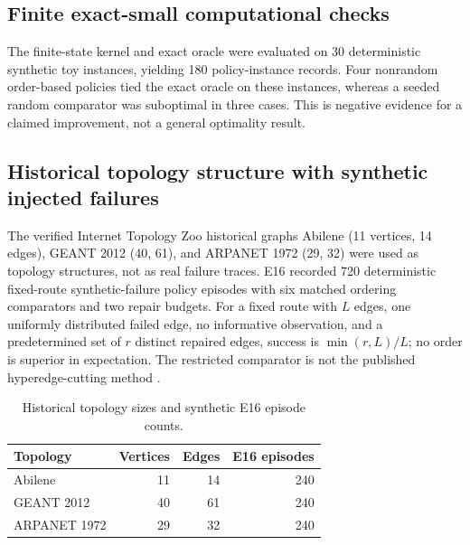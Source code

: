 \subsection{Finite exact-small computational checks}
The finite-state kernel and exact oracle were evaluated on 30 deterministic synthetic toy instances, yielding 180 policy-instance records. Four nonrandom order-based policies tied the exact oracle on these instances, whereas a seeded random comparator was suboptimal in three cases. This is negative evidence for a claimed improvement, not a general optimality result.

\subsection{Historical topology structure with synthetic injected failures}
The verified Internet Topology Zoo historical graphs Abilene (11 vertices, 14 edges), GEANT 2012 (40, 61), and ARPANET 1972 (29, 32) were used as topology structures, not as real failure traces. E16 recorded 720 deterministic fixed-route synthetic-failure policy episodes with six matched ordering comparators and two repair budgets. For a fixed route with $L$ edges, one uniformly distributed failed edge, no informative observation, and a predetermined set of $r$ distinct repaired edges, success is $\min(r,L)/L$; no order is superior in expectation. The restricted comparator is not the published hyperedge-cutting method \citep{Javdani2014}.

\begin{table}[H]\centering\small
\caption{Historical topology sizes and synthetic E16 episode counts.}\label{tab:e21-topologies}
\begin{tabular}{lrrr}\toprule
Topology & Vertices & Edges & E16 episodes\\\midrule
Abilene & 11 & 14 & 240\\
GEANT 2012 & 40 & 61 & 240\\
ARPANET 1972 & 29 & 32 & 240\\\bottomrule
\end{tabular}
\end{table}

